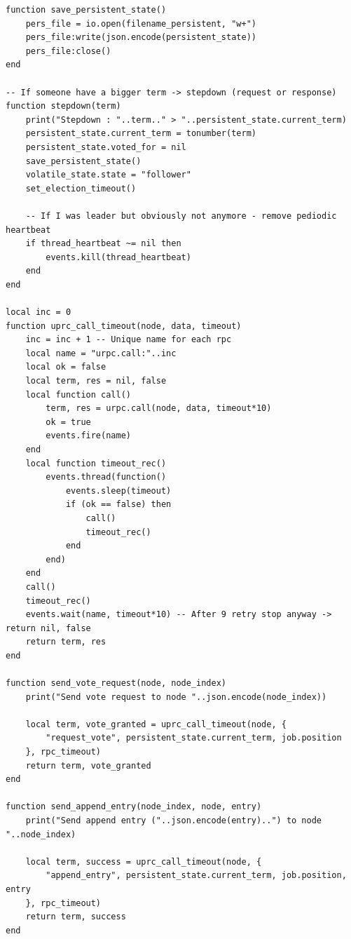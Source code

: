 \documentclass{eplmastersthesis}
\begin{document}
        \begin{minipage}{\linewidth}
        \begin{lstlisting}[style=MySmallLua,caption={Utils functions - for all nodes}]
function save_persistent_state()
    pers_file = io.open(filename_persistent, "w+")
    pers_file:write(json.encode(persistent_state))
    pers_file:close()
end

-- If someone have a bigger term -> stepdown (request or response)
function stepdown(term)
    print("Stepdown : "..term.." > "..persistent_state.current_term)
    persistent_state.current_term = tonumber(term)
    persistent_state.voted_for = nil
    save_persistent_state()
    volatile_state.state = "follower"
    set_election_timeout()

    -- If I was leader but obviously not anymore - remove pediodic heartbeat
    if thread_heartbeat ~= nil then
        events.kill(thread_heartbeat)
    end
end

local inc = 0
function uprc_call_timeout(node, data, timeout)
    inc = inc + 1 -- Unique name for each rpc
    local name = "urpc.call:"..inc
    local ok = false
    local term, res = nil, false
    local function call()
        term, res = urpc.call(node, data, timeout*10)
        ok = true
        events.fire(name)
    end
    local function timeout_rec()
        events.thread(function()
            events.sleep(timeout)
            if (ok == false) then
                call()
                timeout_rec()
            end
        end)
    end
    call()
    timeout_rec()
    events.wait(name, timeout*10) -- After 9 retry stop anyway -> return nil, false
    return term, res
end

function send_vote_request(node, node_index)
    print("Send vote request to node "..json.encode(node_index))

    local term, vote_granted = uprc_call_timeout(node, {
        "request_vote", persistent_state.current_term, job.position
    }, rpc_timeout)
    return term, vote_granted
end

function send_append_entry(node_index, node, entry)
    print("Send append entry ("..json.encode(entry)..") to node "..node_index)

    local term, success = uprc_call_timeout(node, {
        "append_entry", persistent_state.current_term, job.position, entry
    }, rpc_timeout)
    return term, success
end
        \end{lstlisting}
        \end{minipage}
\end{document}
